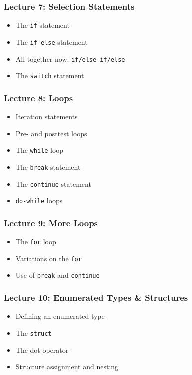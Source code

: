 \begin{frame}
\frametitle{Lecture 7: Selection Statements}

{\Large
\begin{itemize}
	\item The \texttt{if} statement
	\item The \texttt{if-else} statement
	\item All together now: \texttt{if/else if/else}
	\item The \texttt{switch} statement	
\end{itemize}
}

\end{frame}

\begin{frame}
\frametitle{Lecture 8: Loops}

{\Large
\begin{itemize}
	\item Iteration statements
	\item Pre- and posttest loops
	\item The \texttt{while} loop
	\item The \texttt{break} statement
	\item The \texttt{continue} statement
	\item \texttt{do-while} loops
	
\end{itemize}
}

\end{frame}

\begin{frame}
\frametitle{Lecture 9: More Loops}

{\Large
\begin{itemize}
	\item The \texttt{for} loop
	\item Variations on the \texttt{for}
	\item Use of \texttt{break} and \texttt{continue}
\end{itemize}
}

\end{frame}


\begin{frame}
\frametitle{Lecture 10: Enumerated Types \& Structures}

{\Large
\begin{itemize}
	\item Defining an enumerated type
	\item The \texttt{struct}
	\item The dot operator
	\item Structure assignment and nesting
\end{itemize}
}

\end{frame}

